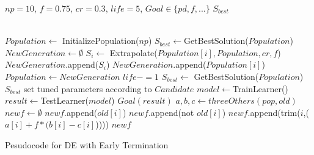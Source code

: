 
\begin{algorithm}[!t]

\scriptsize
\begin{algorithmic}[1]
\Require $\mathit{np} = 10$, $f=0.75$, $cr=0.3$, $\mathit{life} = 5$, $\mathit{Goal} \in \{\mathit{pd},f,...\}$
\Ensure $S_{best}$

~\\
 \State $Population  \gets $ InitializePopulation($\mathit{np}$)   
 \State $S_{best} \gets $GetBestSolution($Population $)
\State $NewGeneration \gets \emptyset$
\State $S_i \gets$ Extrapolate($Population [i], Population , cr, f$)
\State $NewGeneration$.append($S_i$)
\Else
\State $NewGeneration$.append($Population [i]$)
\EndIf
\EndFor
\State $Population  \gets NewGeneration$
\State $life -=1$
\EndIf
\State $S_{best} \gets$ GetBestSolution($Population $)
 \EndWhile
\State \Return $S_{best}$
\EndFunction
{}
   \State set tuned parameters according to $Candidate$
   \State $model \gets$TrainLearner()
   \State $result \gets$TestLearner($model$)   
   \State \Return$\mathit{Goal}(result)$  
\EndFunction
{}
  \State $a, b, c\gets threeOthers(pop,old)$  
  \State $newf \gets \emptyset$
         \State $newf$.append($old[i]$)
                \Else
                    \State $newf$.append(not $old[i]$)
         \Else
          \State $newf$.append(trim($i$,($a[i] + f * (b[i] - c[i]$)))) 
         \EndIf
       \EndIf
  \EndFor
 \State \Return $newf$
\EndFunction
        \end{algorithmic} 
\caption{Pesudocode for DE with Early Termination}
\label{alg:DE}
\end{algorithm}
